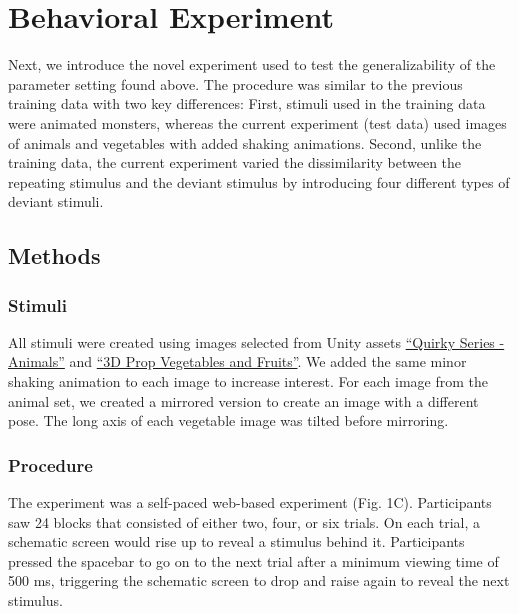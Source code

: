 \documentclass[10pt, letterpaper]{article}
\begin{document}
\hypertarget{behavioral-experiment}{%
\section{Behavioral Experiment}\label{behavioral-experiment}}

Next, we introduce the novel experiment used to test the
generalizability of the parameter setting found above. The procedure was
similar to the previous training data with two key differences: First,
stimuli used in the training data were animated monsters, whereas the
current experiment (test data) used images of animals and vegetables
with added shaking animations. Second, unlike the training data, the
current experiment varied the dissimilarity between the repeating
stimulus and the deviant stimulus by introducing four different types of
deviant stimuli.

\hypertarget{methods}{%
\subsection{Methods}\label{methods}}

\hypertarget{stimuli}{%
\subsubsection{Stimuli}\label{stimuli}}

All stimuli were created using images selected from Unity assets
\href{https://assetstore.unity.com/packages/3d/characters/animals/quirky-series-animals-mega-pack-vol-2-183280}{``Quirky
Series - Animals''} and
\href{https://assetstore.unity.com/packages/3d/props/food/3d-prop-vegetables-and-fruits-237790}{``3D
Prop Vegetables and Fruits''}. We added the same minor shaking animation
to each image to increase interest. For each image from the animal set,
we created a mirrored version to create an image with a different pose.
The long axis of each vegetable image was tilted before mirroring.

\hypertarget{procedure}{%
\subsubsection{Procedure}\label{procedure}}

The experiment was a self-paced web-based experiment (Fig. 1C).
Participants saw 24 blocks that consisted of either two, four, or six
trials. On each trial, a schematic screen would rise up to reveal a
stimulus behind it. Participants pressed the spacebar to go on to the
next trial after a minimum viewing time of 500 ms, triggering the
schematic screen to drop and raise again to reveal the next stimulus.
\end{document}
